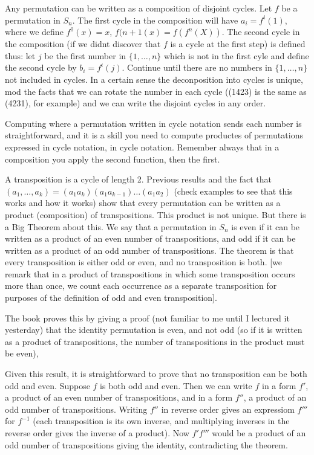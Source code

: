 \documentclass[12pt]{article}
\begin{document}
Any permutation can be written as a composition of disjoint cycles.  Let $f$ be a permutation in $S_n$.  The first cycle in the composition will have
$a_i = f^i(1)$, where we define $f^0(x) = x$, $f({n+1}(x)= f(f^n(X))$.  The second cycle in the composition (if we didnt discover that $f$ is a cycle at the first step) is defined thus:  let $j$ be the first number in $\{1,\ldots,n\}$ which is not in the first cyle and define the second cycle by $b_i = f^i(j)$.   Continue until there are no numbers in $\{1,\ldots,n\}$ not included in cycles.  In a certain sense the deconposition into cycles is unique, mod the facts that we can rotate the number in each cycle ((1423) is the same as (4231), for example) and we can write the disjoint cycles in any order.

Computing where a permutation written in cycle notation sends each number is straightforward, and it is a skill you need to compute productes of permutations expressed in cycle notation, in cycle notation.  Remember always that in a composition you apply the second function, then the first.

A transposition is a cycle of length 2.  Previous results and the fact that $(a_1,\ldots,a_k) = (a_1a_k)(a_1a_{k-1})\ldots(a_1a_2)$ (check examples to see that this works and how it works) show that every permutation can be written as a product (composition) of transpositions.  This product is not unique.  But there is a Big Theorem about this.  We say that a permutation in $S_n$ is even if it can be written as a product of an even number of transpositions, and odd if it can be written as a product of an odd number of transpositions.  The theorem is that every transposition is either odd or even, and no transposition is both. [we remark that in a product of transpositions in which some transposition occurs more than once, we count each occurrence as a separate transposition for purposes of the definition of odd and even transposition].

The book proves this by giving a proof (not familiar to me until I lectured it yesterday) that the identity permutation is even, and not odd (so if it is written as a product of transpositions, the number of transpositions in the product must be even),

Given this result, it is straightforward to prove that no transposition can be both odd and even.  Suppose $f$ is both odd and even.  Then we can write $f$ in a form $f'$, a product of an even number of transpositions, and in a form $f''$, a product of an odd number of transpositions.  Writing $f''$ in reverse order gives an expressiom $f'''$ for $f^{-1}$ (each transposition is its own inverse, and multiplying inverses in the reverse order gives the inverse of a product).  Now $f'f'''$ would be a product of an odd number of transpositions giving the identity, contradicting the theorem.
\end{document}
